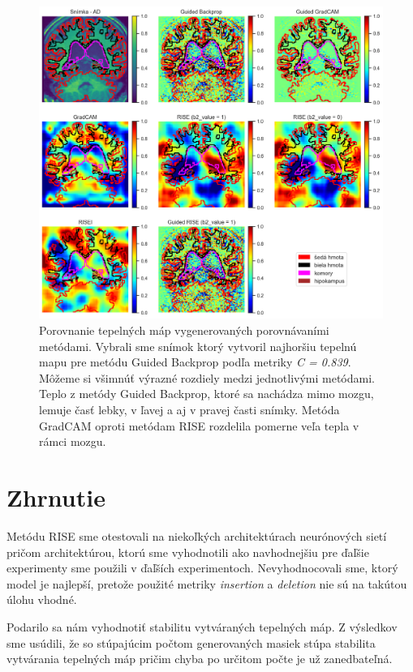 \begin{figure}[h!]
    \centering
    \includegraphics[width=14.5cm]{assets/images/method_evaluation_1.png}
    \caption{\small{Porovnanie tepelných máp vygenerovaných porovnávaními metódami. Vybrali sme snímok ktorý vytvoril najhoršiu tepelnú mapu pre metódu Guided Backprop podľa metriky \textit{C = 0.839}. Môžeme si všimnúť výrazné rozdiely medzi jednotlivými metódami. Teplo z metódy Guided Backprop, ktoré sa nachádza mimo mozgu, lemuje časť lebky, v ľavej a aj v pravej časti snímky. Metóda GradCAM oproti metódam RISE rozdelila pomerne veľa tepla v rámci mozgu.}}
    \label{fig:method_evaluation_1}
\end{figure}


\section{Zhrnutie}

Metódu RISE sme otestovali na niekoľkých architektúrach neurónových sietí pričom architektúrou, ktorú sme vyhodnotili ako navhodnejšiu pre ďaľšie experimenty sme použili v ďaľších experimentoch. Nevyhodnocovali sme, ktorý model je najlepší, pretože použité metriky \textit{insertion} a \textit{deletion} nie sú na takútou úlohu vhodné.

Podarilo sa nám vyhodnotiť stabilitu vytváraných tepelných máp. Z výsledkov sme usúdili, že so stúpajúcim počtom generovaných masiek stúpa stabilita vytvárania tepelných máp pričim chyba po určitom počte je už zanedbateľná.

